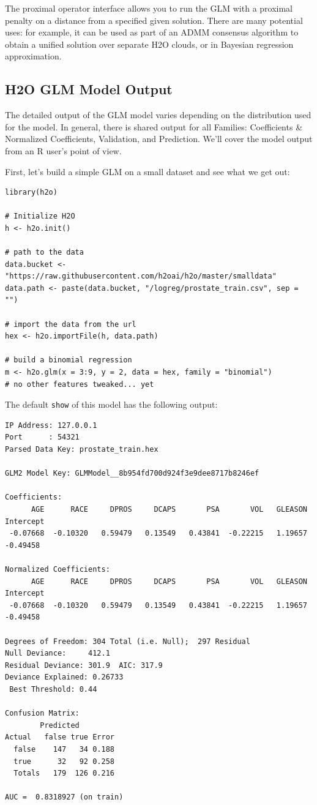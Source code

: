 The proximal operator interface allows you to run the GLM with a proximal penalty on a distance from a specified given solution. There are many potential uses: for example, it can be used as part of an ADMM consensus algorithm to obtain a unified solution over separate H2O clouds, or in Bayesian regression approximation.

\subsection{H2O GLM Model Output}
The detailed output of the GLM model varies depending on the distribution used for the model. In general, there is shared output for all Families: Coefficients \& Normalized Coefficients, Validation, and Prediction. We'll cover the model output from an R user's  point of view.

First, let's build a simple GLM on a small dataset and see what we get out:

\begin{lstlisting}[style=R]
library(h2o)

# Initialize H2O
h <- h2o.init()

# path to the data
data.bucket <- "https://raw.githubusercontent.com/h2oai/h2o/master/smalldata"
data.path <- paste(data.bucket, "/logreg/prostate_train.csv", sep = "")

# import the data from the url
hex <- h2o.importFile(h, data.path)

# build a binomial regression
m <- h2o.glm(x = 3:9, y = 2, data = hex, family = "binomial")  
# no other features tweaked... yet
\end{lstlisting}

The default \texttt{show} of this model has the following output:

\begin{lstlisting}[style=output]
IP Address: 127.0.0.1 
Port      : 54321 
Parsed Data Key: prostate_train.hex 

GLM2 Model Key: GLMModel__8b954fd700d924f3e9dee8717b8246ef

Coefficients:
      AGE      RACE     DPROS     DCAPS       PSA       VOL   GLEASON Intercept 
 -0.07668  -0.10320   0.59479   0.13549   0.43841  -0.22215   1.19657  -0.49458 

Normalized Coefficients:
      AGE      RACE     DPROS     DCAPS       PSA       VOL   GLEASON Intercept 
 -0.07668  -0.10320   0.59479   0.13549   0.43841  -0.22215   1.19657  -0.49458 

Degrees of Freedom: 304 Total (i.e. Null);  297 Residual
Null Deviance:     412.1
Residual Deviance: 301.9  AIC: 317.9
Deviance Explained: 0.26733 
 Best Threshold: 0.44

Confusion Matrix:
        Predicted
Actual   false true Error
  false    147   34 0.188
  true      32   92 0.258
  Totals   179  126 0.216

AUC =  0.8318927 (on train) 
\end{lstlisting}

